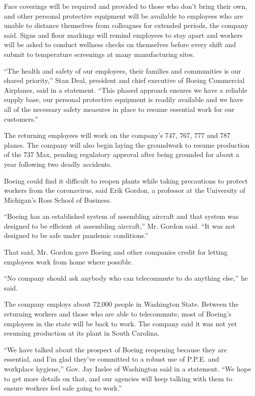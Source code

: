 Face coverings will be required and provided to those who don't bring
their own, and other personal protective equipment will be available to
employees who are unable to distance themselves from colleagues for
extended periods, the company said. Signs and floor markings will remind
employees to stay apart and workers will be asked to conduct wellness
checks on themselves before every shift and submit to temperature
screenings at many manufacturing sites.

``The health and safety of our employees, their families and communities
is our shared priority,'' Stan Deal, president and chief executive of
Boeing Commercial Airplanes, said in a statement. ``This phased approach
ensures we have a reliable supply base, our personal protective
equipment is readily available and we have all of the necessary safety
measures in place to resume essential work for our customers.''

The returning employees will work on the company's 747, 767, 777 and 787
planes. The company will also begin laying the groundwork to resume
production of the 737 Max, pending regulatory approval after being
grounded for about a year following two deadly accidents.

Boeing could find it difficult to reopen plants while taking precautions
to protect workers from the coronavirus, said Erik Gordon, a professor
at the University of Michigan's Ross School of Business.

``Boeing has an established system of assembling aircraft and that
system was designed to be efficient at assembling aircraft,'' Mr. Gordon
said. ``It was not designed to be safe under pandemic conditions.''

That said, Mr. Gordon gave Boeing and other companies credit for letting
employees work from home where possible.

``No company should ask anybody who can telecommute to do anything
else,'' he said.

The company employs about 72,000 people in Washington State. Between the
returning workers and those who are able to telecommute, most of
Boeing's employees in the state will be back to work. The company said
it was not yet resuming production at its plant in South Carolina.

``We have talked about the prospect of Boeing reopening because they are
essential, and I'm glad they've committed to a robust use of P.P.E. and
workplace hygiene,'' Gov. Jay Inslee of Washington said in a statement.
``We hope to get more details on that, and our agencies will keep
talking with them to ensure workers feel safe going to work.''

